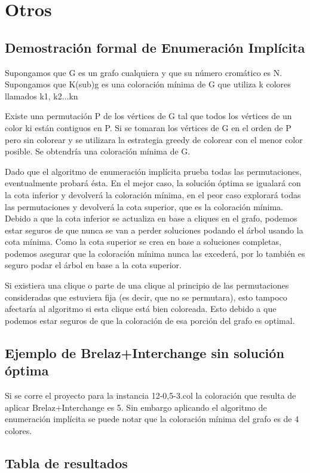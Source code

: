 \documentclass[a4paper,10pt]{article}
\begin{document}
\section{Otros}
\subsection{Demostración formal de Enumeración Implícita}
Supongamos que G es un grafo cualquiera y que su número cromático es N.
Supongamos que K(sub)g es una coloración mínima de G que utiliza k colores llamados k1, k2...kn

   Existe una permutación P de los vértices de G tal que todos los vértices de un color ki están contiguos en P.
      Si se tomaran los vértices de G en el orden de P pero sin colorear y se utilizara la estrategia greedy de colorear con el menor color posible. Se obtendría una coloración mínima de G.
      
      Dado que el algoritmo de enumeración implícita prueba todas las permutaciones, eventualmente probará ésta. En el mejor caso, la solución óptima se igualará con la cota inferior y devolverá la coloración mínima, en el peor caso explorará todas las permutaciones y devolverá la cota superior, que es la coloración mínima.
      Debido a que la cota inferior se actualiza en base a cliques en el grafo, podemos estar seguros de que nunca se van a perder soluciones podando el árbol usando la cota mínima.
      Como la cota superior se crea en base a soluciones completas, podemos asegurar que la coloración mínima nunca las excederá, por lo también es seguro podar el árbol en base a la cota superior.


Si existiera una clique o parte de una clique al principio de las permutaciones consideradas que estuviera fija (es decir, que no se permutara), esto tampoco afectaría al algoritmo si esta clique está bien coloreada. Esto debido a que podemos estar seguros de que la coloración de esa porción del grafo es optimal.

\subsection{Ejemplo de Brelaz+Interchange sin solución óptima}
Si se corre el proyecto para la instancia 12-0,5-3.col la coloración que resulta de aplicar Brelaz+Interchange 
es 5. Sin embargo aplicando el algoritmo de enumeración implícita se puede notar que la coloración mínima del grafo
es de 4 colores.

\subsection{Tabla de resultados}
\newpage
\end{document}
